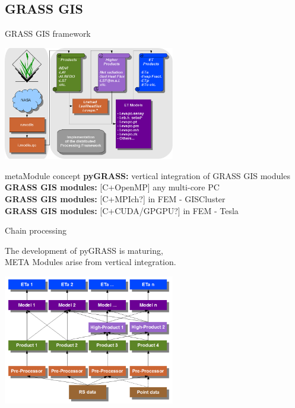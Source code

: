 \documentclass[xcolor=dvipsnames,beamer]{beamer} %
\begin{document}
\subsection{GRASS GIS}
\begin{frame}[fragile]{GRASS GIS framework}

\begin{center}
 \includegraphics[width=7.5cm]{architecture_implementation}
\end{center}

\begin{block}{metaModule concept}
{\bf pyGRASS:} vertical integration of GRASS GIS modules\\
{\bf GRASS GIS modules:} [C+OpenMP] any multi-core PC \\
{\bf GRASS GIS modules:} [C+MPIch?] in FEM - GISCluster \\
{\bf GRASS GIS modules:} [C+CUDA/GPGPU?] in FEM - Tesla
\end{block}

\end{frame}

\begin{frame}[fragile]{Chain processing}

The development of pyGRASS is maturing,\\
META Modules arise from vertical integration.

\begin{center}
 \includegraphics[width=7.5cm]{chain0}
\end{center}

\end{frame}
\end{document}
